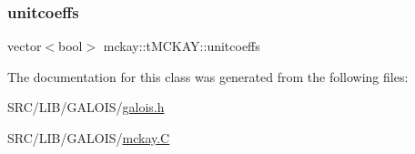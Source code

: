 \mbox{\label{classmckay_1_1t_m_c_k_a_y_a640367986232519161646d7fde5fa1d4}} 
\subsubsection{\texorpdfstring{unitcoeffs}{unitcoeffs}}
{\footnotesize\ttfamily vector$<$bool$>$ mckay\+::t\+M\+C\+K\+A\+Y\+::unitcoeffs\hspace{0.3cm}{\ttfamily [protected]}}



The documentation for this class was generated from the following files\+:\begin{DoxyCompactItemize}
\item 
S\+R\+C/\+L\+I\+B/\+G\+A\+L\+O\+I\+S/\mbox{\hyperlink{galois_8h}{galois.\+h}}\item 
S\+R\+C/\+L\+I\+B/\+G\+A\+L\+O\+I\+S/\mbox{\hyperlink{mckay_8_c}{mckay.\+C}}\end{DoxyCompactItemize}
